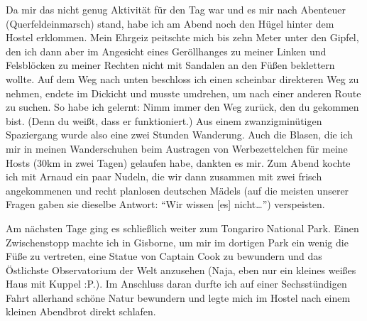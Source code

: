 Da mir das nicht genug Aktivität für den Tag war und es mir nach
Abenteuer (Querfeldeinmarsch) stand, habe ich am Abend noch den Hügel
hinter dem Hostel erklommen. Mein Ehrgeiz peitschte mich bis zehn Meter
unter den Gipfel, den ich dann aber im Angesicht eines Geröllhanges zu
meiner Linken und Felsblöcken zu meiner Rechten nicht mit Sandalen an
den Füßen beklettern wollte. Auf dem Weg nach unten beschloss ich einen
scheinbar direkteren Weg zu nehmen, endete im Dickicht und musste
umdrehen, um nach einer anderen Route zu suchen. So habe ich gelernt:
Nimm immer den Weg zurück, den du gekommen bist. (Denn du weißt, dass er
funktioniert.) Aus einem zwanzigminütigen Spaziergang wurde also eine
zwei Stunden Wanderung. Auch die Blasen, die ich mir in meinen
Wanderschuhen beim Austragen von Werbezettelchen für meine Hosts (30km
in zwei Tagen) gelaufen habe, dankten es mir. Zum Abend kochte ich mit
Arnaud ein paar Nudeln, die wir dann zusammen mit zwei frisch
angekommenen und recht planlosen deutschen Mädels (auf die meisten
unserer Fragen gaben sie dieselbe Antwort: ``Wir wissen {[}es{]}
nicht\ldots'') verspeisten.

Am nächsten Tage ging es schließlich weiter zum Tongariro National Park.
Einen Zwischenstopp machte ich in Gisborne, um mir im dortigen Park ein
wenig die Füße zu vertreten, eine Statue von Captain Cook zu bewundern
und das Östlichste Observatorium der Welt anzusehen (Naja, eben nur ein
kleines weißes Haus mit Kuppel :P.). Im Anschluss daran durfte ich auf
einer Sechsstündigen Fahrt allerhand schöne Natur bewundern und legte
mich im Hostel nach einem kleinen Abendbrot direkt schlafen.

